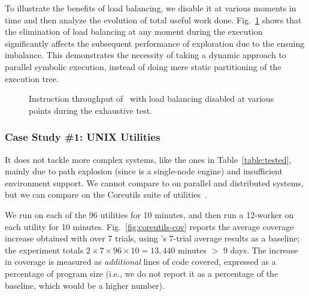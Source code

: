 To illustrate the benefits of load balancing, we disable it at various moments in time and then analyze the evolution of total useful work done. Fig.~\ref{fig:scalab-static-balancing} shows that the elimination of load balancing at any moment during the execution significantly affects the subsequent performance of exploration due to the ensuing imbalance.  This demonstrates the necessity of taking a dynamic approach to parallel symbolic execution, instead of doing mere static partitioning of the execution tree.



\begin{figure}[h!]
  \centering
  \caption{Instruction throughput of \cnine\ with load balancing disabled at various points during the exhaustive test.}
  \label{fig:scalab-static-balancing}
  \vspace{-0.5cm}
\end{figure}

\subsubsection{Case Study \#1: UNIX Utilities}
\label{sec:coreutils}

  It does not tackle more complex systems, like the ones in Table~\ref{table:tested}, mainly due to path explosion (since \klee is a single-node engine) and insufficient environment support.  We cannot compare \cnine to \klee on parallel and distributed systems, but we can compare on the Coreutils suite of \unix utilities~\cite{coreutils}.

We run \klee on each of the 96 utilities for 10 minutes, and then  run a 12-worker \cnine on each utility for 10 minutes. Fig.~\ref{fig:coreutils-cov} reports the average coverage increase obtained with \cnine over 7 trials, using \klee's 7-trial average results as a baseline; the experiment totals $2 \times 7 \times 96 \times 10 = 13,440$ minutes $>$ 9 days.  The increase in coverage is measured as {\em additional} lines of code covered, expressed as a percentage of program size (i.e., we do not report it as a percentage of the baseline, which would be a higher number).

